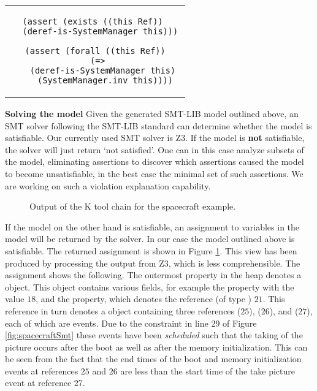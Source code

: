 \begin{center}
\begin{tabular}{c}
\begin{lstlisting}
(assert (exists ((this Ref)) 
  (deref-is-SystemManager this)))

(assert (forall ((this Ref))
  (=> 
    (deref-is-SystemManager this) 
    (SystemManager.inv this))))
\end{lstlisting}
\end{tabular}
\end{center}

\textbf{Solving the model} Given the generated SMT-LIB model outlined
above, an SMT solver following the SMT-LIB standard can determine
whether the model is satisfiable. Our currently used SMT solver is
Z3. If the model is {\bf not} satisfiable, the solver will just return
`not satisfied'. One can in this case analyze subsets of the model,
eliminating assertions to discover which assertions caused the model
to become unsatisfiable, in the best case the minimal set of such
assertions. We are working on such a violation explanation capability.

\begin{figure}
\caption{Output of the K tool chain for the spacecraft example.}
\label{fig:shapes}
\end{figure}

If the model on the other hand is satisfiable, an assignment to
variables in the model will be returned by the solver. In our case the
model outlined above is satisfiable. The returned assignment is shown
in Figure \ref{fig:shapes}. This view has been produced by processing
the output from Z3, which is less comprehensible.
%
The assignment shows the following. The outermost 
property in the heap denotes a  object.  This object
contains various fields, for example the  property with
the value $18$, and the  property, which denotes the
reference (of type ) $21$. This reference in turn denotes a
 object containing three references 
($25$),  ($26$), and  ($27$), each of
which are events. Due to the constraint in line 29 of Figure
\ref{fig:spacecraftSmt} these events have been {\em scheduled} such
that the taking of the picture occurs after the boot as well as after
the memory initialization.  This can be seen from the fact that the
end times of the boot and memory initialization events at references
$25$ and $26$ are less than the start time of the take picture event
at reference $27$.

\lstset{language=K}
